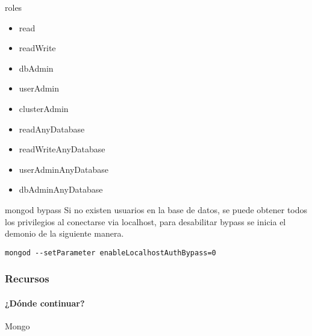 \documentclass[12pt]{beamer}
\begin{document}
\begin{frame}[fragile]{roles}
\begin{multicols}{2}

  \begin{itemize}
    \item read

    \item readWrite

    \item dbAdmin

    \item userAdmin

    \item clusterAdmin

    \item readAnyDatabase

    \item readWriteAnyDatabase

    \item userAdminAnyDatabase

    \item dbAdminAnyDatabase
    
  \end{itemize}
\end{multicols}
\end{frame}


\begin{frame}[fragile]{mongod bypass}
Si no existen usuarios en la base de datos, se puede obtener todos los
privilegios al conectarse via localhost, para desabilitar bypass se inicia el
demonio de la siguiente manera.

\begin{verbatim}
mongod --setParameter enableLocalhostAuthBypass=0
\end{verbatim}
\end{frame}


\newcommand{\putlink}[1]{%
   \pgfsetlinewidth{1.4pt}%
   \pgfsetendarrow{\pgfarrowtriangle{4pt}}%
   \pgfline{\pgfxy(1,1)}{\pgfxy(#1,1)}
}


\begin{frame}
  \frametitle{Recursos}
  \framesubtitle{¿Dónde continuar?}
  \begin{thebibliography}{10}

  \beamertemplatearticlebibitems

    Mongo


  \end{thebibliography}
\end{frame}

\end{document}

